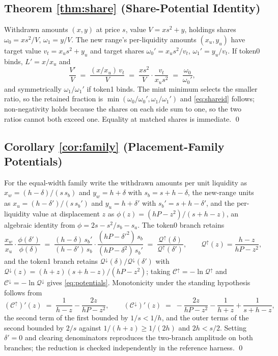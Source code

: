 \documentclass[11pt,a4paper]{article}
\theoremstyle{definition}
\theoremstyle{plain}
\theoremstyle{remark}
\begin{document}
\subsection{Theorem \ref{thm:share} (Share-Potential Identity)}

Withdrawn amounts $(x, y)$ at price $s$, value $V = x s^2 + y$,
holdings shares $\omega_0 = x s^2/V$, $\omega_1 = y/V$. The new
range's per-liquidity amounts $(x_u, y_u)$ have target value $v_t =
x_u s^2 + y_u$ and target shares $\omega_0' = x_u s^2 / v_t$,
$\omega_1' = y_u / v_t$. If token0 binds, $L' = x/x_u$ and
\[
\frac{V'}{V} \;=\; \frac{(x/x_u)\, v_t}{V}
\;=\; \frac{x s^2}{V} \cdot \frac{v_t}{x_u s^2}
\;=\; \frac{\omega_0}{\omega_0'},
\]
and symmetrically $\omega_1/\omega_1'$ if token1 binds. The mint minimum selects the smaller ratio, so the retained fraction is
$\min(\omega_0/\omega_0', \omega_1/\omega_1')$ and \eqref{eq:shareid}
follows; non-negativity holds because the shares on each side sum to one, so the two ratios cannot both exceed one. Equality at matched shares is immediate. \qed

\subsection{Corollary \ref{cor:family} (Placement-Family Potentials)}

For the equal-width family write the withdrawn amounts per unit liquidity as $x_w = (h - \delta)/(s\,s_b)$ and $y_w = h + \delta$ with $s_b = s + h - \delta$, the new-range units as $x_u = (h -
\delta')/(s\,s_b')$ and $y_u = h + \delta'$ with $s_b' = s + h -
\delta'$, and the per-liquidity value at displacement $z$ as
$\phi(z) = (hP - z^2)/(s + h - z)$, an algebraic identity from $\phi = 2s - s^2/s_b - s_a$. The token0 branch retains
\[
\frac{x_w}{x_u} \cdot \frac{\phi(\delta')}{\phi(\delta)}
\;=\; \frac{(h-\delta)\,s_b'}{(h-\delta')\,s_b} \cdot
\frac{(hP - \delta'^2)\, s_b}{(hP - \delta^2)\, s_b'}
\;=\; \frac{\mathcal{Q}^{\uparrow}(\delta)}{\mathcal{Q}^{\uparrow}(\delta')},
\qquad \mathcal{Q}^{\uparrow}(z) = \frac{h - z}{hP - z^2},
\]
and the token1 branch retains $\mathcal{Q}^{\downarrow}(\delta)/
\mathcal{Q}^{\downarrow}(\delta')$ with $\mathcal{Q}^{\downarrow}(z) = (h + z)(s + h -
z)/(hP - z^2)$; taking $\mathcal{C}^{\uparrow} = -\ln \mathcal{Q}^{\uparrow}$
and $\mathcal{C}^{\downarrow} = -\ln \mathcal{Q}^{\downarrow}$ gives
\eqref{eq:potentials}. Monotonicity under the standing hypothesis
follows from
\[
(\mathcal{C}^{\uparrow})'(z) \;=\; \frac{1}{h - z} -
\frac{2z}{hP - z^2}, \qquad
(\mathcal{C}^{\downarrow})'(z) \;=\; -\frac{2z}{hP - z^2} -
\frac{1}{h + z} + \frac{1}{s + h - z},
\]
the second term of the first bounded by $1/s < 1/h$, and the outer terms of the second bounded by $2/s$ against $1/(h + z) \ge 1/(2h)$ and $2h < s/2$. Setting $\delta' = 0$ and clearing
denominators reproduces the two-branch amplitude on both branches; the reduction is checked independently in the reference harness. \qed
\end{document}
